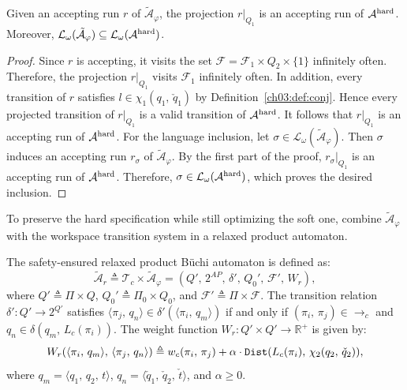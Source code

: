 \begin{theorem}\label{ch03:theo:saferun}
Given an accepting run $r$ of $\tilde{\mathcal{A}}_{\varphi}$, the projection
$r|_{Q_1}$ is an accepting run of $\mathcal{A}^{\textup{hard}}$. Moreover,
$\mathcal{L}_{\omega}(\tilde{\mathcal{A}}_{\varphi}) \subseteq
\mathcal{L}_{\omega}(\mathcal{A}^{\textup{hard}})$.
\end{theorem}

\begin{proof}
Since $r$ is accepting, it visits the set
$\mathcal{F} = \mathcal{F}_1 \times Q_2 \times \{1\}$ infinitely often.
Therefore, the projection $r|_{Q_1}$ visits $\mathcal{F}_1$ infinitely often.
In addition, every transition of $r$ satisfies
$l \in \chi_1(q_1,\, \check{q}_1)$ by
Definition~\ref{ch03:def:conj}. Hence every projected transition of $r|_{Q_1}$
is a valid transition of $\mathcal{A}^{\textup{hard}}$. It follows that
$r|_{Q_1}$ is an accepting run of $\mathcal{A}^{\textup{hard}}$.
For the language inclusion, let
$\sigma \in \mathcal{L}_{\omega}(\tilde{\mathcal{A}}_{\varphi})$. Then
$\sigma$ induces an accepting run $r_{\sigma}$ of
$\tilde{\mathcal{A}}_{\varphi}$. By the first part of the proof,
$r_{\sigma}|_{Q_1}$ is an accepting run of
$\mathcal{A}^{\textup{hard}}$. Therefore,
$\sigma \in \mathcal{L}_{\omega}(\mathcal{A}^{\textup{hard}})$, which proves
the desired inclusion.
\end{proof}

To preserve the hard specification while still optimizing the soft one, combine
$\tilde{\mathcal{A}}_{\varphi}$ with the workspace transition system in a
relaxed product automaton.

\begin{definition}\label{ch03:def:safe}
The safety-ensured relaxed product B\"uchi automaton is defined as:
\begin{equation}
\tilde{\mathcal{A}}_{r}
\triangleq
\mathcal{T}_c \times \tilde{\mathcal{A}}_{\varphi}
=
(Q',\, 2^{AP},\, \delta',\, Q_0',\, \mathcal{F}',\, W_r),
\label{ch03:eq:safe-product}
\end{equation}
where $Q' \triangleq \Pi \times Q$,
$Q_0' \triangleq \Pi_0 \times Q_0$, and
$\mathcal{F}' \triangleq \Pi \times \mathcal{F}$. The transition relation
$\delta' : Q' \rightarrow 2^{Q'}$ satisfies
$\langle \pi_j,\, q_n \rangle \in \delta'(\langle \pi_i,\, q_m \rangle)$ if and
only if $(\pi_i,\, \pi_j) \in \longrightarrow_c$ and
$q_n \in \delta(q_m,\, L_c(\pi_i))$. The weight function
$W_r : Q' \times Q' \rightarrow \mathbb{R}^{+}$ is given by:
\begin{equation}
W_r(\langle \pi_i,\, q_m \rangle,\,
\langle \pi_j,\, q_n \rangle)
\triangleq  w_c(\pi_i,\, \pi_j) + \alpha \cdot
\textup{\texttt{Dist}}(L_c(\pi_i),\, \chi_2(q_2,\, \check{q}_2)),
\label{ch03:eq:weight-soft}
\end{equation}
where $q_m = \langle q_1,\, q_2,\, t \rangle$,
$q_n = \langle \check{q}_1,\, \check{q}_2,\, \check{t} \rangle$, and
$\alpha \geq 0$.
\end{definition}

